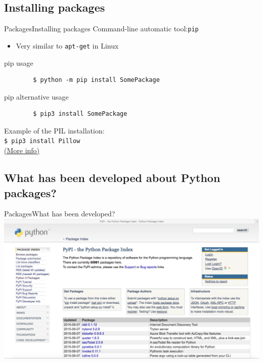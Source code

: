 \documentclass[10pt,compress]{beamer} %
\begin{document}
\subsection{Installing packages}
\begin{frame}[fragile]{Packages}{Installing packages}
	Command-line automatic tool:\texttt{pip} 
		\begin{itemize}
			\item Very similar to \texttt{apt-get} in Linux
		\end{itemize}

	\begin{block}{pip usage}
	\begin{verbatim}
		$ python -m pip install SomePackage
	\end{verbatim}
	\end{block}

	\begin{block}{pip alternative usage}
	\begin{verbatim}
		$ pip3 install SomePackage
	\end{verbatim}
	\end{block}
	Example of the PIL  installation:\\
	\texttt{\$ pip3 install Pillow}\\
\alert{\href{http://recursospython.com/guias-y-manuales/instalacion-y-utilizacion-de-pip-en-windows-linux-y-os-x/}{(More info)}}
\end{frame}

\subsection{What has been developed about Python packages?}
\begin{frame}{Packages}{What has been developed?}
\centering \includegraphics[scale=0.267]{figs/PyPI.pdf}\\
\end{frame}
\end{document}
